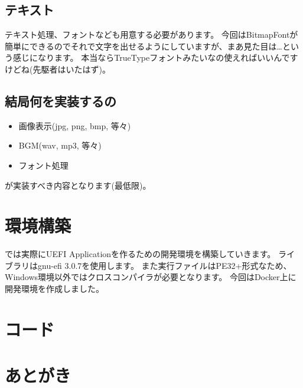 \documentclass[10pt, b5paper, openany]{ltjsbook}
\begin{document}
\section{テキスト}
テキスト処理、フォントなども用意する必要があります。
今回はBitmapFontが簡単にできるのでそれで文字を出せるようにしていますが、まあ見た目は…という感じになります。
本当ならTrueTypeフォントみたいなの使えればいいんですけどね(先駆者はいたはず)。

\section{結局何を実装するの}
\begin{itemize}
    \item 画像表示(jpg, png, bmp, 等々)
    \item BGM(wav, mp3, 等々)
    \item フォント処理
\end{itemize}
が実装すべき内容となります(最低限)。

\chapter{環境構築}
では実際にUEFI Applicationを作るための開発環境を構築していきます。
ライブラリはgnu-efi 3.0.7を使用します。
また実行ファイルはPE32+形式なため、Windows環境以外ではクロスコンパイラが必要となります。
今回はDocker上に開発環境を作成しました。

\chapter{コード}
\chapter{あとがき}
\end{document}
